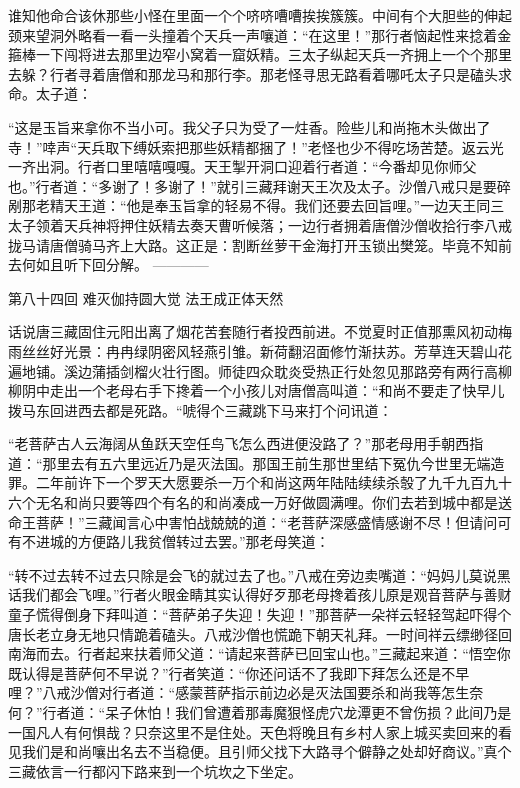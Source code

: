 \documentclass[12pt,UTF8]{ctexbook}
\begin{document}
{	谁知他命合该休那些小怪在里面一个个哜哜嘈嘈挨挨簇簇。中间有个大胆些的伸起颈来望洞外略看一看一头撞着个天兵一声嚷道：“在这里！”那行者恼起性来捻着金箍棒一下闯将进去那里边窄小窝着一窟妖精。三太子纵起天兵一齐拥上一个个那里去躲？行者寻着唐僧和那龙马和那行李。那老怪寻思无路看着哪吒太子只是磕头求命。太子道：
	
	“这是玉旨来拿你不当小可。我父子只为受了一炷香。险些儿和尚拖木头做出了寺！”啈声“天兵取下缚妖索把那些妖精都捆了！”老怪也少不得吃场苦楚。返云光一齐出洞。行者口里嘻嘻嘎嘎。天王掣开洞口迎着行者道：“今番却见你师父也。”行者道：“多谢了！多谢了！”就引三藏拜谢天王次及太子。沙僧八戒只是要碎剐那老精天王道：“他是奉玉旨拿的轻易不得。我们还要去回旨哩。”一边天王同三太子领着天兵神将押住妖精去奏天曹听候落；一边行者拥着唐僧沙僧收拾行李八戒拢马请唐僧骑马齐上大路。这正是：割断丝萝干金海打开玉锁出樊笼。毕竟不知前去何如且听下回分解。
	------------
	
	第八十四回 难灭伽持圆大觉 法王成正体天然
	
	话说唐三藏固住元阳出离了烟花苦套随行者投西前进。不觉夏时正值那熏风初动梅雨丝丝好光景：冉冉绿阴密风轻燕引雏。新荷翻沼面修竹渐扶苏。芳草连天碧山花遍地铺。溪边蒲插剑榴火壮行图。师徒四众耽炎受热正行处忽见那路旁有两行高柳柳阴中走出一个老母右手下搀着一个小孩儿对唐僧高叫道：“和尚不要走了快早儿拨马东回进西去都是死路。“唬得个三藏跳下马来打个问讯道：
	
	“老菩萨古人云海阔从鱼跃天空任鸟飞怎么西进便没路了？”那老母用手朝西指道：“那里去有五六里远近乃是灭法国。那国王前生那世里结下冤仇今世里无端造罪。二年前许下一个罗天大愿要杀一万个和尚这两年陆陆续续杀彀了九千九百九十六个无名和尚只要等四个有名的和尚凑成一万好做圆满哩。你们去若到城中都是送命王菩萨！”三藏闻言心中害怕战兢兢的道：“老菩萨深感盛情感谢不尽！但请问可有不进城的方便路儿我贫僧转过去罢。”那老母笑道：
	
	“转不过去转不过去只除是会飞的就过去了也。”八戒在旁边卖嘴道：“妈妈儿莫说黑话我们都会飞哩。”行者火眼金睛其实认得好歹那老母搀着孩儿原是观音菩萨与善财童子慌得倒身下拜叫道：“菩萨弟子失迎！失迎！”那菩萨一朵祥云轻轻驾起吓得个唐长老立身无地只情跪着磕头。八戒沙僧也慌跪下朝天礼拜。一时间祥云缥缈径回南海而去。行者起来扶着师父道：“请起来菩萨已回宝山也。”三藏起来道：“悟空你既认得是菩萨何不早说？”行者笑道：“你还问话不了我即下拜怎么还是不早哩？”八戒沙僧对行者道：“感蒙菩萨指示前边必是灭法国要杀和尚我等怎生奈何？”行者道：“呆子休怕！我们曾遭着那毒魔狠怪虎穴龙潭更不曾伤损？此间乃是一国凡人有何惧哉？只奈这里不是住处。天色将晚且有乡村人家上城买卖回来的看见我们是和尚嚷出名去不当稳便。且引师父找下大路寻个僻静之处却好商议。”真个三藏依言一行都闪下路来到一个坑坎之下坐定。
	
}
\end{document}
